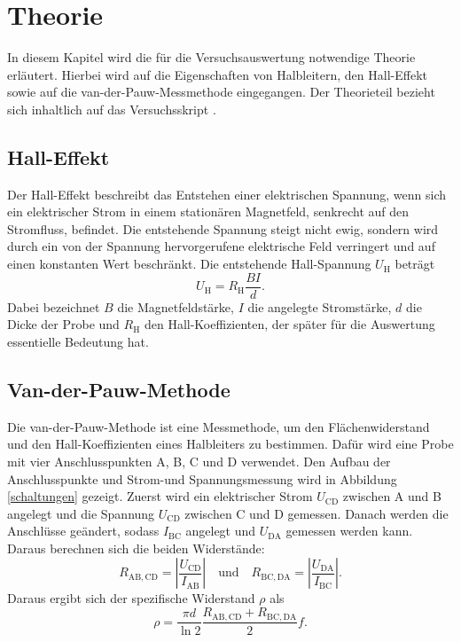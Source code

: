 \section{Theorie}\label{theorie}
In diesem Kapitel wird die für die Versuchsauswertung notwendige Theorie erläutert. Hierbei wird auf die Eigenschaften von Halbleitern, den Hall-Effekt sowie auf die van-der-Pauw-Messmethode eingegangen. Der Theorieteil bezieht sich inhaltlich auf das Versuchsskript \cite{hall}.
\subsection{Hall-Effekt}
Der Hall-Effekt beschreibt das Entstehen einer elektrischen Spannung, wenn sich ein elektrischer Strom in einem stationären Magnetfeld, senkrecht auf den Stromfluss, befindet. Die entstehende Spannung steigt nicht ewig, sondern wird durch ein von der Spannung hervorgerufene elektrische Feld verringert und auf einen konstanten Wert beschränkt. Die entstehende Hall-Spannung $U_\mathrm{H}$ beträgt
\begin{equation}
    U_\mathrm{H}=R_\mathrm{H}\frac{BI}{d}.
\end{equation}
Dabei bezeichnet $B$ die Magnetfeldstärke, $I$ die angelegte Stromstärke, $d$ die Dicke der Probe und $R_\mathrm{H}$ den Hall-Koeffizienten, der später für die Auswertung essentielle Bedeutung hat.

\subsection{ Van-der-Pauw-Methode}
\label{sec:vanPauw}

Die van-der-Pauw-Methode ist eine Messmethode, um den Flächenwiderstand und den Hall-Koeffizienten eines Halbleiters zu bestimmen. Dafür wird eine Probe mit vier Anschlusspunkten A, B, C und D verwendet. Den Aufbau der Anschlusspunkte und Strom-und Spannungsmessung wird in Abbildung \ref{schaltungen} gezeigt. Zuerst wird ein elektrischer Strom $U_{\mathrm{CD}}$ zwischen A und B angelegt und die Spannung $U_{\mathrm{CD}}$ zwischen C und D gemessen. Danach werden die Anschlüsse geändert, sodass $I_{\mathrm{BC}}$ angelegt und $U_{\mathrm{DA}}$ gemessen werden kann. Daraus berechnen sich die beiden Widerstände:
\begin{equation}R_{\mathrm{AB,CD}}=\left|\frac{U_{\mathrm{CD}}}{I_{\mathrm{AB}}}\right| \quad\text{und}\quad R_{\mathrm{BC,DA}}=\left|\frac{U_{\mathrm{DA}}}{I_{\mathrm{BC}}}\right|. \end{equation}
Daraus ergibt sich der spezifische Widerstand $\rho$ als
\begin{equation}\label{eq:roh}
    \rho=\frac{\pi d}{\ln{2}}\frac{R_{\mathrm{AB,CD}}+R_{\mathrm{BC,DA}}}{2}f.
\end{equation}

